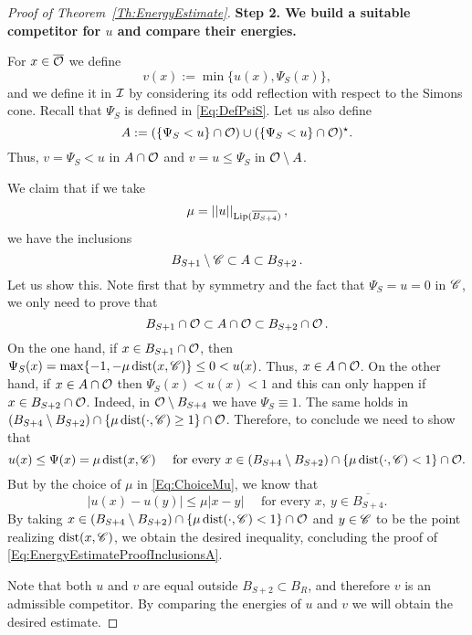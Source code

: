 \begin{proof}[Proof of Theorem~\ref{Th:EnergyEstimate}]
\textbf{Step 2. We build a suitable competitor for $u$ and compare their energies.}

For $x\in \overline{\mathcal{O}}$ we define
$$ 
v(x) := \min\{u(x),\Psi_S(x)\}, 
$$
and we define it in $\mathcal{I}$ by considering its odd reflection with respect to the Simons cone. Recall that $\Psi_S$ is defined in \eqref{Eq:DefPsiS}. Let us also define
$$
A :=(\{\Psi_S < u\}\cap \mathcal{O}) \cup (\{\Psi_S < u\}\cap \mathcal{O})^\star. 
$$
Thus, $v = \Psi_S < u$ in $A\cap \mathcal{O}$ and $v=u\leq\Psi_S$ in $\mathcal{O} \setminus A$. 

We claim that if we take
\begin{equation}
	\label{Eq:ChoiceMu}
	\mu = \left | \left |{u} \right | \right |_{\mathrm{Lip}(\overline{B_{S+4}})},
\end{equation}
we have the inclusions
\begin{equation}
\label{Eq:EnergyEstimateProofInclusionsA}
	B_{S+1}\setminus \mathscr{C} \subset A \subset B_{S+2}\,.
\end{equation}
Let us show this. Note first that by symmetry and the fact that $\Psi_S = u =0$ in $\mathscr{C}$, we only need to prove that 
$$
	B_{S+1} \cap \mathcal{O}\subset A \cap \mathcal{O}\subset B_{S+2}\cap \mathcal{O}\,.
$$
On the one hand, if $ x\in B_{S+1}\cap \mathcal{O}$, then $\Psi_S(x) = \max\{-1,-\mu\operatorname{dist}(x,\mathscr{C})\} \leq 0 < u(x)$. Thus, $x\in A\cap \mathcal{O}$. On the other hand, if $ x\in A\cap \mathcal{O}$ then $\Psi_S(x) < u(x) < 1$ and this can only happen if $x\in B_{S+2}\cap \mathcal{O}$. Indeed, in $\mathcal{O}\setminus B_{S+4}$ we have $\Psi_S \equiv 1$. The same holds in $(B_{S+4}\setminus B_{S+2})\cap \{\mu \operatorname{dist}(\cdot, \mathscr{C})\geq 1\} \cap \mathcal{O}$. Therefore, to conclude we need to show that 
$$
u(x) \leq \Psi(x) = \mu \operatorname{dist} (x,\mathscr{C}) \quad \text{ for every } x \in (B_{S+4}\setminus B_{S+2})\cap \{\mu \operatorname{dist}(\cdot, \mathscr{C})< 1\} \cap \mathcal{O}.
$$
But by the choice of $\mu$ in \eqref{Eq:ChoiceMu}, we know that
$$
|u(x) - u(y)|\leq \mu |x-y| \quad \text{ for every } x, \ y \in \overline{B_{S+4}}.
$$
By taking $x \in (B_{S+4}\setminus B_{S+2})\cap \{\mu \operatorname{dist}(\cdot, \mathscr{C})< 1\} \cap \mathcal{O}$ and  $y\in \mathscr{C}$ to be the point realizing $\operatorname{dist}(x,\mathscr{C})$, we obtain the desired inequality, concluding the proof of \eqref{Eq:EnergyEstimateProofInclusionsA}.

Note that both $u$ and $v$ are equal outside $B_{S+2} \subset B_R$, and therefore $v$ is an admissible competitor. By comparing the energies of $u$ and $v$ we will obtain the desired estimate. 


\end{proof}
